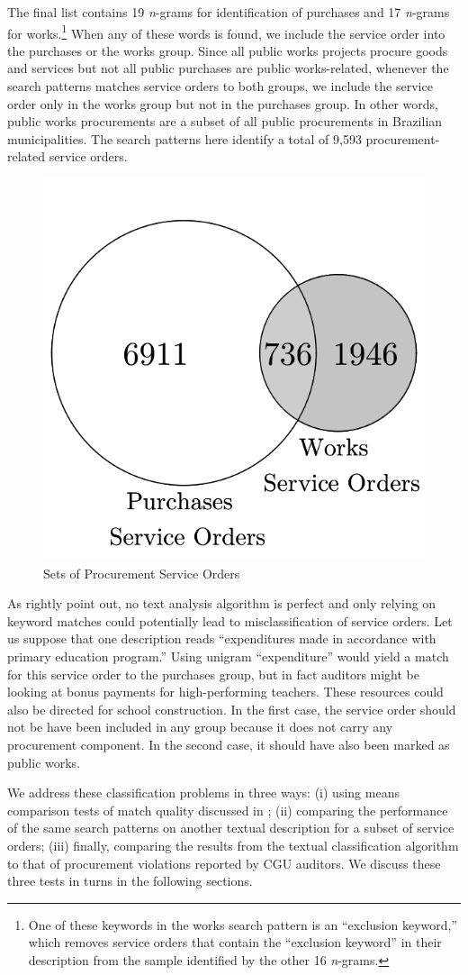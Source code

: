 \documentclass[11pt]{article}
\begin{document}
The final list contains 19 \emph{n}-grams for identification of purchases and 17 \emph{n}-grams for works.\footnote{One of these keywords in the works search pattern is an ``exclusion keyword,'' which removes service orders that contain the ``exclusion keyword'' in their description from the sample identified by the other 16 \emph{n}-grams.} When any of these words is found, we include the service order into the purchases or the works group. Since all public works projects procure goods and services but not all public purchases are public works-related, whenever the search patterns matches service orders to both groups, we include the service order only in the works group but not in the purchases group. In other words, public works procurements are a subset of all public procurements in Brazilian municipalities. The search patterns here identify a total of 9,593 procurement-related service orders.

\begin{figure}[!htbp]
\caption{\label{fig:venn} Sets of Procurement Service Orders}
\centering
\includegraphics[width=0.3\linewidth]{venn}
\end{figure}

As \citet{GrimmerTextDataPromise2013a} rightly point out, no text analysis algorithm is perfect and only relying on keyword matches could potentially lead to misclassification of service orders. Let us suppose that one description reads ``expenditures made in accordance with primary education program.'' Using unigram ``expenditure'' would yield a match for this service order to the purchases group, but in fact auditors might be looking at bonus payments for high-performing teachers. These resources could also be directed for school construction. In the first case, the service order should not be have been included in any group because it does not carry any procurement component. In the second case, it should have also been marked as public works.

We address these classification problems in three ways: (i) using means comparison tests of match quality discussed in \citet{AssumpcaotextfindDataDrivenText2018}; (ii) comparing the performance of the same search patterns on another textual description for a subset of service orders; (iii) finally, comparing the results from the textual classification algorithm to that of procurement violations reported by CGU auditors. We discuss these three tests in turns in the following sections.
\end{document}

